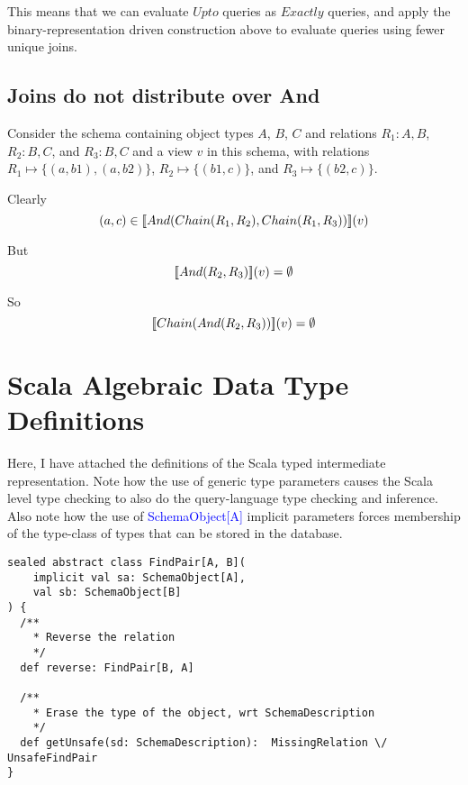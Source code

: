\documentclass[12pt,a4paper,twoside,openright]{report}
\newcommand\codeName[1]{\textcolor{blue}{#1}}
\newcommand{\db}[1]{{\bf [\![}#1{\bf ]\!]}}
\newcommand{\deno}[1]{\db{#1}(v)}
\newcommand{\denoRule}[2]{#1 \in \deno{#2}}
\begin{document}
{{This means that we can evaluate $Upto$ queries as $Exactly$ queries, and apply the binary-representation driven construction above to evaluate queries using fewer unique joins.


\section{Joins do not distribute over And}

Consider the schema containing object types $A$, $B$, $C$ and relations $R_1 \colon A,B$, $R_2 \colon B,C$,  and $R_3 \colon B,C$ and a view $v$ in this schema, with relations $R_1 \mapsto \lbrace(a, b1), (a, b2)\rbrace$, $R_2 \mapsto \lbrace(b1, c)\rbrace$, and $R_3 \mapsto \lbrace(b2, c)\rbrace$.

Clearly 
\begin{equation}
\denoRule{(a,c)}{And(Chain(R_1, R_2), Chain(R_1, R_3))}
\end{equation}

But 
\begin{equation}
 \deno{And(R_2, R_3)} = \emptyset
\end{equation}

So
\begin{equation}
 \deno{Chain(And(R_2, R_3))} = \emptyset
\end{equation}
 
\chapter{Scala Algebraic Data Type Definitions}
Here, I have attached the definitions of the Scala typed intermediate representation. Note how the use of generic type parameters causes the Scala level type checking to also do the query-language type checking and inference. Also note how the use of \codeName{SchemaObject[A]} implicit parameters forces membership of the type-class of types that can be stored in the database.
\begin{framed}
\begin{verbatim}
sealed abstract class FindPair[A, B](
    implicit val sa: SchemaObject[A],
    val sb: SchemaObject[B]
) {
  /**
    * Reverse the relation
    */
  def reverse: FindPair[B, A]

  /**
    * Erase the type of the object, wrt SchemaDescription
    */
  def getUnsafe(sd: SchemaDescription):  MissingRelation \/ UnsafeFindPair
}
\end{verbatim}
\end{framed}

}}
\end{document}
